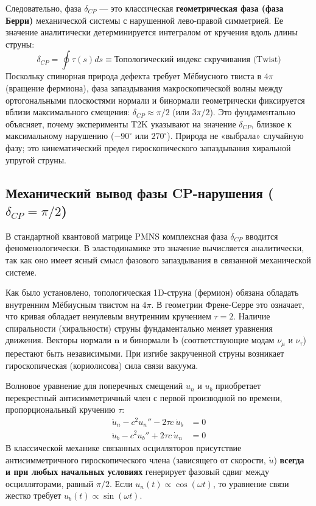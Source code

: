 \documentclass[12pt,a4paper]{article}
\begin{document}
	Следовательно, фаза $\delta_{CP}$ — это классическая \textbf{геометрическая фаза (фаза Берри)} механической системы с нарушенной лево-правой симметрией. Ее значение аналитически детерминируется интегралом от кручения вдоль длины струны:
	\begin{equation}
		\delta_{CP} = \oint \tau(s) ds \equiv \text{Топологический индекс скручивания (Twist)}
	\end{equation}
	Поскольку спинорная природа дефекта требует Мёбиусного твиста в $4\pi$ (вращение фермиона), фаза запаздывания макроскопической волны между ортогональными плоскостями нормали и бинормали геометрически фиксируется вблизи максимального смещения: $\delta_{CP} \approx \pi/2$ (или $3\pi/2$). Это фундаментально объясняет, почему эксперименты T2K указывают на значение $\delta_{CP}$, близкое к максимальному нарушению ($-90^\circ$ или $270^\circ$). Природа не «выбрала» случайную фазу; это кинематический предел гироскопического запаздывания хиральной упругой струны.
	
	\subsection{Механический вывод фазы CP-нарушения ($\delta_{CP} = \pi/2$)}
	В стандартной квантовой матрице PMNS комплексная фаза $\delta_{CP}$ вводится феноменологически. В эластодинамике это значение вычисляется аналитически, так как оно имеет ясный смысл фазового запаздывания в связанной механической системе.
	
	Как было установлено, топологическая 1D-струна (фермион) обязана обладать внутренним Мёбиусным твистом на $4\pi$. В геометрии Френе-Серре это означает, что кривая обладает ненулевым внутренним кручением $\tau = 2$.
	Наличие спиральности (хиральности) струны фундаментально меняет уравнения движения. Векторы нормали $\mathbf{n}$ и бинормали $\mathbf{b}$ (соответствующие модам $\nu_\mu$ и $\nu_\tau$) перестают быть независимыми. При изгибе закрученной струны возникает гироскопическая (кориолисова) сила связи вакуума. 
	
	Волновое уравнение для поперечных смещений $u_n$ и $u_b$ приобретает перекрестный антисимметричный член с первой производной по времени, пропорциональный кручению $\tau$:
	\begin{align}
		\ddot{u}_n - c^2 u_n'' - 2\tau c \ \dot{u}_b &= 0 \\
		\ddot{u}_b - c^2 u_b'' + 2\tau c \ \dot{u}_n &= 0
	\end{align}
	В классической механике связанных осцилляторов присутствие антисимметричного гироскопического члена (зависящего от скорости, $\dot{u}$) \textbf{всегда и при любых начальных условиях} генерирует фазовый сдвиг между осцилляторами, равный $\pi/2$.
	Если $u_n(t) \propto \cos(\omega t)$, то уравнение связи жестко требует $u_b(t) \propto \sin(\omega t)$. 
	
\end{document}
